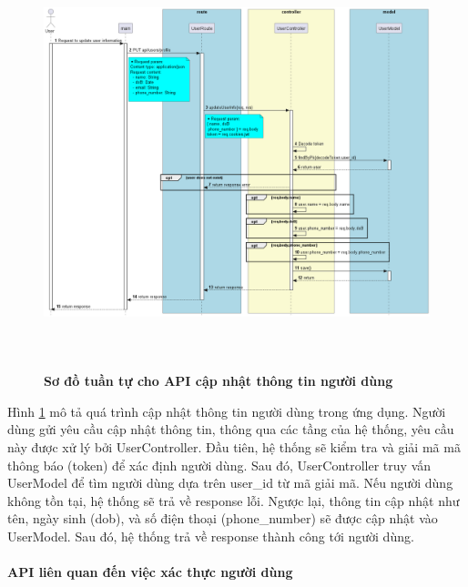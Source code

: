\begin{figure}[H]
  \centering
  \includegraphics[width=16cm,height=12cm]{Images/server/sequence/server/updateUserInfo.png}
  \caption[Sơ đồ tuần tự cho API cập nhật thông tin người dùng ]{\bfseries \fontsize{12pt}{0pt}
  \selectfont Sơ đồ tuần tự cho API cập nhật thông tin người dùng }
  \label{updateUserInfo} %
\end{figure}

Hình \ref{updateUserInfo} mô tả quá trình cập nhật thông tin người dùng trong ứng dụng. Người dùng gửi yêu cầu cập nhật thông tin, thông qua các tầng của hệ thống, yêu cầu này được xử lý bởi UserController. Đầu tiên, hệ thống sẽ kiểm tra và giải mã mã thông báo (token) để xác định người dùng. Sau đó, UserController truy vấn UserModel để tìm người dùng dựa trên user\_id từ mã giải mã. Nếu người dùng không tồn tại, hệ thống sẽ trả về response lỗi. Ngược lại, thông tin cập nhật như tên, ngày sinh (dob), và số điện thoại (phone\_number) sẽ được cập nhật vào UserModel. Sau đó, hệ thống trả về response thành công tới người dùng.






\paragraph{API liên quan đến việc xác thực người dùng }
\mbox{}


